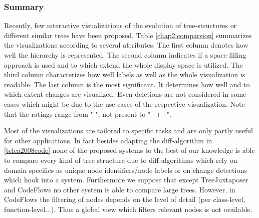 
\subsubsection{Summary}
Recently, few interactive visualizations of the evolution of tree-structures or different similar trees have been proposed. Table \ref{chap2:comparsion} summarizes the visualizations according to several attributes. The first column denotes how well the hierarchy is represented. The second column indicates if a space filling approach is used and to which extend the whole display space is utilized. The third column characterizes how well labels as well as the whole visualization is readable. The last column is the most significant. It determines how well and to which extent changes are visualized. Even deletions are not considered in some cases which might be due to the use cases of the respective visualization. Note that the ratings range from "-", not present to "+++".

Most of the visualizations are tailored to specific tasks and are only partly useful for other applications. In fact besides adapting the diff-algorithm in \ref{telea2008code} none of the proposed systems to the best of our knowledge is able to compare every kind of tree structure due to diff-algorithms which rely on domain specifics as unique node identifiers/node labels or on change detections which hook into a system. Furthermore we suppose that except TreeJuxtaposer and CodeFlows no other system is able to compare large trees. However, in CodeFlows the filtering of nodes depends on the level of detail (per class-level, function-level...). Thus a global view which filters relevant nodes is not available.






